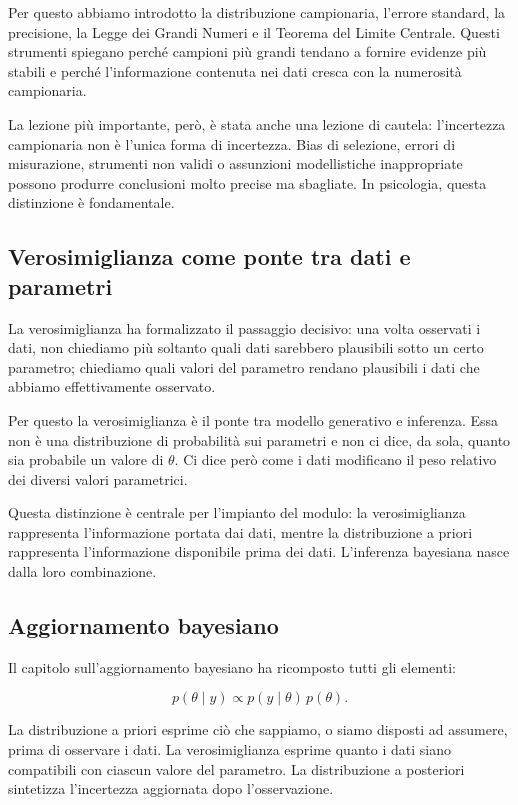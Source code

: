 \documentclass[
  italian,
  letterpaper,
  a4paper,
  11pt,
  open=any]{scrbook}
\theoremstyle{plain}
\theoremstyle{definition}
\theoremstyle{definition}
\theoremstyle{remark}
\begin{document}
Per questo abbiamo introdotto la distribuzione campionaria, l'errore
standard, la precisione, la Legge dei Grandi Numeri e il Teorema del
Limite Centrale. Questi strumenti spiegano perché campioni più grandi
tendano a fornire evidenze più stabili e perché l'informazione contenuta
nei dati cresca con la numerosità campionaria.

La lezione più importante, però, è stata anche una lezione di cautela:
l'incertezza campionaria non è l'unica forma di incertezza. Bias di
selezione, errori di misurazione, strumenti non validi o assunzioni
modellistiche inappropriate possono produrre conclusioni molto precise
ma sbagliate. In psicologia, questa distinzione è fondamentale.

\subsection*{Verosimiglianza come ponte tra dati e
parametri}\label{verosimiglianza-come-ponte-tra-dati-e-parametri}

La verosimiglianza ha formalizzato il passaggio decisivo: una volta
osservati i dati, non chiediamo più soltanto quali dati sarebbero
plausibili sotto un certo parametro; chiediamo quali valori del
parametro rendano plausibili i dati che abbiamo effettivamente
osservato.

Per questo la verosimiglianza è il ponte tra modello generativo e
inferenza. Essa non è una distribuzione di probabilità sui parametri e
non ci dice, da sola, quanto sia probabile un valore di \(\theta\). Ci
dice però come i dati modificano il peso relativo dei diversi valori
parametrici.

Questa distinzione è centrale per l'impianto del modulo: la
verosimiglianza rappresenta l'informazione portata dai dati, mentre la
distribuzione a priori rappresenta l'informazione disponibile prima dei
dati. L'inferenza bayesiana nasce dalla loro combinazione.

\subsection*{Aggiornamento bayesiano}\label{aggiornamento-bayesiano}

Il capitolo sull'aggiornamento bayesiano ha ricomposto tutti gli
elementi:

\[
p(\theta \mid y) \propto p(y \mid \theta)\,p(\theta).
\]

La distribuzione a priori esprime ciò che sappiamo, o siamo disposti ad
assumere, prima di osservare i dati. La verosimiglianza esprime quanto i
dati siano compatibili con ciascun valore del parametro. La
distribuzione a posteriori sintetizza l'incertezza aggiornata dopo
l'osservazione.
\end{document}

